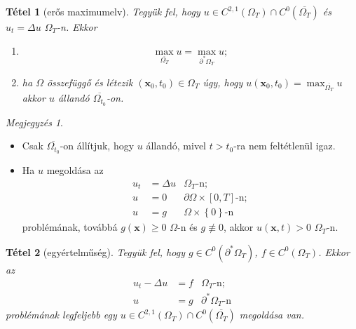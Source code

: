 \documentclass[DIV=15,appendixprefix]{scrreprt}
\newtheorem*{tetel}{Tétel}
\theoremstyle{definition}
\theoremstyle{remark}
\newtheorem*{megj}{Megjegyzés}
\begin{document}
%
\begin{tetel}[erős maximumelv]
	Tegyük fel, hogy $ u \in C^{ 2,{} 1 } \left( \Omega_{ T } \right) \cap C^{ 0 } \left(
	\overline{ \Omega_{ T } } \right) $ és $ u_{ t } = \Delta u $ $ \Omega_{ T } $-n. Ekkor
		\begin{enumerate}
		\item
			\begin{equation*}
				\max_{ \overline{ \Omega_{ T } } } u = \max_{ \partial^{ * } \Omega_{ T } } u;
			\end{equation*}
		\item ha $ \Omega $ összefüggő és létezik $ \left( \mathbf{ x }_{ 0 },{} t_{ 0 } \right) \in
			\Omega_{ T } $ úgy, hogy $ u \left(\mathbf{ x }_{ 0 },{} t_{ 0 } \right) =
			\max_{ \overline{ \Omega_{ T } } } u $ akkor $ u $ állandó
			$ \overline{ \Omega_{ t_{ 0 } } } $-on.
		\end{enumerate}
\end{tetel}
\begin{megj}\leavevmode
	\begin{itemize}
		\item Csak $ \overline{ \Omega_{ t_{ 0 } } } $-on állítjuk, hogy $ u $ állandó, mivel $ t > t_{ 0 } $-ra nem feltétlenül igaz.
		\item Ha $ u $ megoldása az
			\begin{align*}
				u_{ t } &= \Delta u & \Omega_{ T } \text{-n};\\
				u &= 0 & \partial \Omega \times \left[ 0,{} T \right] \text{-n};\\
				u &= g& \Omega \times \left\{ 0 \right\} \text{-n}
			\end{align*}
		problémának, továbbá $ g\left( \mathbf{ x } \right) \ge 0 $ $ \Omega $-n és $ g \not \equiv 0 $, akkor $ u \left( \mathbf{ x },{} t \right) > 0 $ $ \Omega_{ T } $-n.
	\end{itemize}
\end{megj}
\begin{tetel}[egyértelműség]
	Tegyük fel, hogy $ g \in C^{ 0 } \left( \partial^{ * } \Omega_{ T } \right) $, $ f \in C^{ 0 }
	\left( \Omega_{ T } \right) $. Ekkor az
	\begin{align*}
		u_{ t } - \Delta u &= f & \Omega_{ T } \text{-n};\\
		u &= g & \partial^{ * } \Omega_{ T } \text{-n}
	\end{align*}
	problémának legfeljebb egy $ u \in C^{ 2,{} 1 } \left( \Omega_{ T } \right) \cap C^{ 0 } \left(
	\overline{ \Omega_{ T } } \right) $ megoldása van.
\end{tetel}
\end{document}
